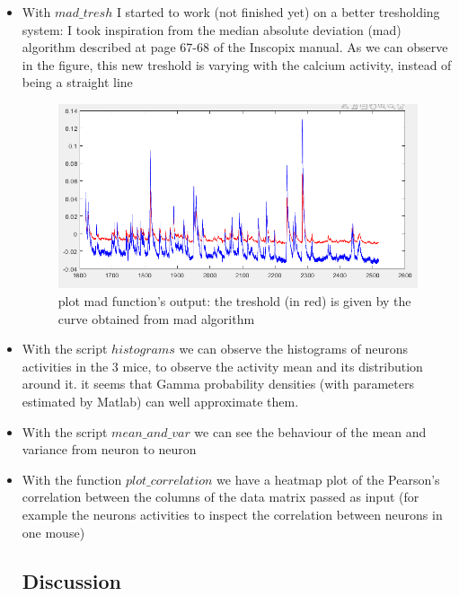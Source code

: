 \documentclass[a4paper]{article}
\begin{document}
\begin{itemize}
		\item With \textit{$mad\_tresh$} I started to work (not finished yet)  on a better tresholding system: I took inspiration from the median absolute deviation (mad) algorithm described at page 67-68 of the Inscopix manual. As we can observe in the figure, this new treshold is varying with the calcium activity, instead of being a straight line
		
		\begin{figure}[H]
			\begin{center}
				\includegraphics[scale=.60]{mad_plot.png} 
			\end{center} 
			\caption{plot mad function's output: the treshold (in red) is given by the curve obtained from mad algorithm}
		\end{figure}
		
		
		\item With the script \textit{$histograms$} we can observe the histograms of neurons activities in the 3 mice, to observe the activity mean and its distribution around it. it seems that Gamma probability densities (with parameters estimated by Matlab) can well approximate them.
		
		\item With the script \textit{$mean\_and\_var$} we can see the behaviour of the mean and variance from neuron to neuron
		
		\item With the function \textit{$plot\_correlation$} we have a heatmap plot of the Pearson's correlation between the columns of the data matrix passed as input (for example the neurons activities to inspect the correlation between neurons in one mouse) 
		
		
		\subsection{Discussion}
		

\end{itemize}
\end{document}
